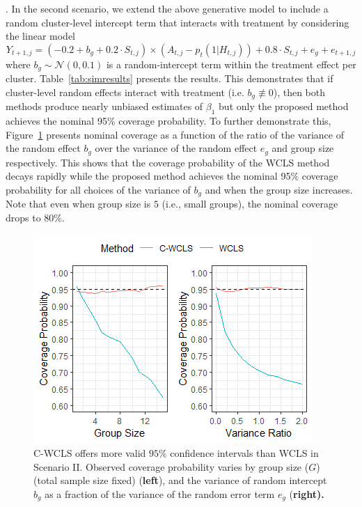 \documentclass[12pt]{article}
\begin{document}
. In the second scenario, we extend the above generative model to include a random cluster-level intercept term that interacts with treatment by considering the linear model
\begin{equation}
Y_{t+1,j} = (-0.2 + b_g +  0.2 \cdot S_{t,j}) \times (A_{t,j} -p_t(1|H_{t,j})) + 0.8 \cdot S_{t,j} + e_g + e_{t+1,j}
\end{equation}
where $b_g \sim \mathcal{N}(0,0.1)$ is a random-intercept term within the treatment effect per cluster. Table~\ref{tab:simresults} presents the results.  This demonstrates that if cluster-level random effects interact with treatment  (i.e. $b_g \not \equiv 0$), then both methods produce nearly unbiased estimates of $\beta_1$ but only the proposed method achieves the nominal 95\% coverage probability. To further demonstrate this, Figure~\ref{fig:undercoverage} presents nominal coverage as a function of the ratio of the variance of the random effect $b_g$ over the variance of the random effect $e_g$ and group size respectively.  This shows that the coverage probability of the WCLS method decays rapidly while the proposed method achieves the nominal 95\% coverage probability for all choices of the variance of $b_g$ and when the group size increases.  Note that even when group size is $5$ (i.e., small groups), the nominal coverage drops to 80\%.

\begin{figure}[htp]
\centering
\includegraphics[scale=0.75]{Rplot_2.png}
\caption{C-WCLS offers more valid $95\%$ confidence intervals than WCLS in Scenario II. Observed coverage probability varies by group size  ($G$) (total sample size fixed) ({\bf left}), and the variance of random intercept $b_g$ as a fraction of the variance of the random error term $e_g$ (\bf right).}
    \label{fig:undercoverage}
\end{figure}
\end{document}
